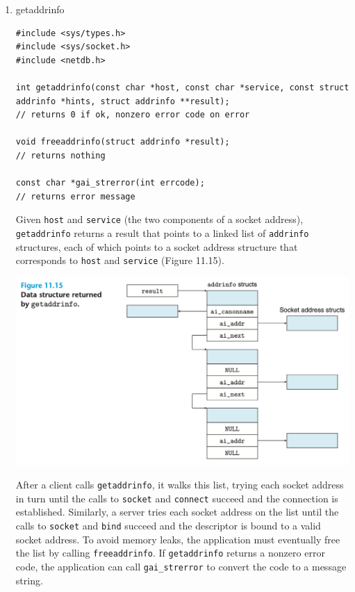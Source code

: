 \documentclass[11pt]{article}
\begin{document}
\begin{enumerate}
\item getaddrinfo
\label{sec:orgd1e27ec}
\begin{verbatim}
#include <sys/types.h>
#include <sys/socket.h>
#include <netdb.h>

int getaddrinfo(const char *host, const char *service, const struct addrinfo *hints, struct addrinfo **result);
// returns 0 if ok, nonzero error code on error

void freeaddrinfo(struct addrinfo *result);
// returns nothing

const char *gai_strerror(int errcode);
// returns error message

\end{verbatim}

Given \texttt{host} and \texttt{service} (the two components of a socket address), \texttt{getaddrinfo} returns a result that points to a linked list of \texttt{addrinfo} structures, each of which points to a socket address structure that corresponds to \texttt{host} and \texttt{service} (Figure 11.15).\\

\begin{center}
\includegraphics[width=.9\linewidth]{pics/figure11.15-data-structure-returned-by-getaddrinfo.png}
\end{center}


After a client calls \texttt{getaddrinfo}, it walks this list, trying each socket address in turn until the calls to \texttt{socket} and \texttt{connect} succeed and the connection is established. Similarly, a server tries each socket address on the list until the calls to \texttt{socket} and \texttt{bind} succeed and the descriptor is bound to a valid socket address. To avoid memory leaks, the application must eventually free the list by calling \texttt{freeaddrinfo}. If \texttt{getaddrinfo} returns a nonzero error code, the application can call \texttt{gai\_strerror} to convert the code to a message string.\\



\end{enumerate}
\end{document}

